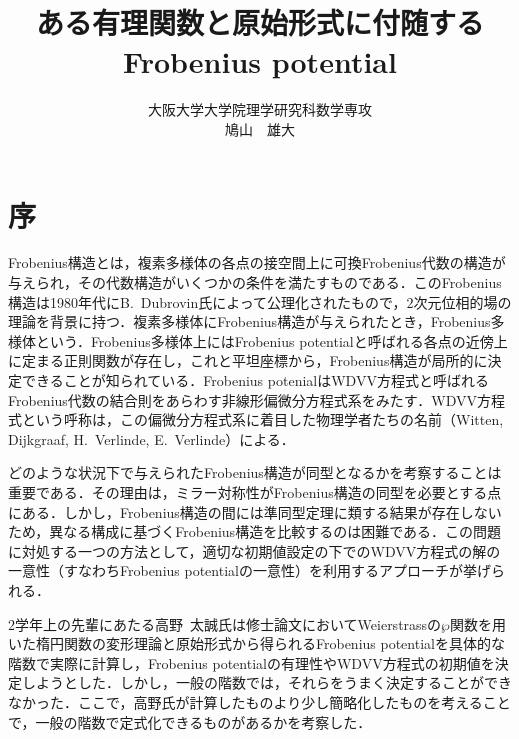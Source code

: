 \documentclass[a4paper,11pt]{jbook}
\theoremstyle{plain}
\theoremstyle{definition}
\theoremstyle{remark}
\theoremstyle{proof}
\numberwithin{equation}{section}
\begin{document}
\title{ある有理関数と原始形式に付随するFrobenius potential}
\date{}%
\author{大阪大学大学院理学研究科数学専攻\\
鳩山　雄大}
\maketitle
\tableofcontents

\chapter*{序}

	Frobenius構造とは，複素多様体の各点の接空間上に可換Frobenius代数の構造が与えられ，その代数構造がいくつかの条件を満たすものである\cite{d:1}．このFrobenius構造は1980年代にB.~Dubrovin氏によって公理化されたもので，$2$次元位相的場の理論を背景に持つ．複素多様体にFrobenius構造が与えられたとき，Frobenius多様体という．Frobenius多様体上にはFrobenius potentialと呼ばれる各点の近傍上に定まる正則関数が存在し，これと平坦座標から，Frobenius構造が局所的に決定できることが知られている．Frobenius potenialはWDVV方程式と呼ばれるFrobenius代数の結合則をあらわす非線形偏微分方程式系をみたす．WDVV方程式という呼称は，この偏微分方程式系に着目した物理学者たちの名前（Witten, Dijkgraaf, H.~Verlinde, E.~Verlinde）による．

	どのような状況下で与えられたFrobenius構造が同型となるかを考察することは重要である．その理由は，ミラー対称性がFrobenius構造の同型を必要とする点にある．しかし，Frobenius構造の間には準同型定理に類する結果が存在しないため，異なる構成に基づくFrobenius構造を比較するのは困難である．この問題に対処する一つの方法として，適切な初期値設定の下でのWDVV方程式の解の一意性（すなわちFrobenius potentialの一意性）を利用するアプローチが挙げられる\cite{ist, shir}．

	$2$学年上の先輩にあたる高野~太誠氏は修士論文\cite{takano}においてWeierstrassの$\wp$関数を用いた楕円関数の変形理論と原始形式から得られるFrobenius potentialを具体的な階数で実際に計算し，Frobenius potentialの有理性やWDVV方程式の初期値を決定しようとした．しかし，一般の階数では，それらをうまく決定することができなかった．ここで，高野氏が計算したものより少し簡略化したものを考えることで，一般の階数で定式化できるものがあるかを考察した．
\end{document}
